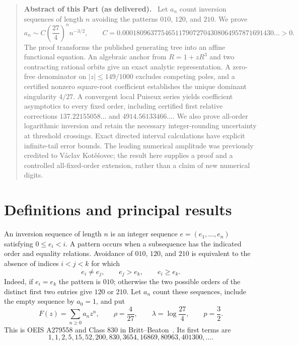 \documentclass[11pt,letterpaper]{article}
\theoremstyle{remark}\newtheorem{remark}[theorem]{Remark}
\newenvironment{partabstract}{\begin{quote}\small\noindent\textbf{Abstract of this Part (as delivered).}\ }{\end{quote}}
\begin{document}
\begin{partabstract}
Let $a_n$ count inversion sequences of length $n$ avoiding the patterns
$010$, $120$, and $210$. We prove
\[
 a_n\sim C\left(\frac{27}{4}\right)^n n^{-3/2},\qquad
 C=0.0001809637754651179072704308064957871691430\ldots>0.
\]
The proof transforms the published generating tree into an affine
functional equation. An algebraic anchor from $R=1+zR^3$ and two
contracting rational orbits give an exact analytic representation.
A zero-free denominator on $|z|\le149/1000$ excludes competing poles,
and a certified nonzero square-root coefficient establishes the unique
dominant singularity $4/27$. A convergent local Puiseux series yields
coefficient asymptotics to every fixed order, including certified first
relative corrections $137.22155058\ldots$ and $4914.56133466\ldots$.
We also prove all-order logarithmic inversion and retain the necessary
integer-rounding uncertainty at threshold crossings. Exact directed
interval calculations have explicit infinite-tail error bounds.
The leading numerical amplitude was previously credited to V\'aclav
Kot\v{e}\v{s}ovec; the result here supplies a proof and a controlled
all-fixed-order extension, rather than a claim of new numerical digits.
\end{partabstract}

\section{Definitions and principal results}
An inversion sequence of length $n$ is an integer sequence
$e=(e_1,\ldots,e_n)$ satisfying $0\le e_i<i$. A pattern occurs when a
subsequence has the indicated order and equality relations. Avoidance
of $010$, $120$, and $210$ is equivalent to the absence of indices
$i<j<k$ for which
\begin{equation}\label{ivk:anc:avoid}
 e_i\ne e_j,\qquad e_j>e_k,\qquad e_i\ge e_k.
\end{equation}
Indeed, if $e_i=e_k$ the pattern is $010$; otherwise the two possible
orders of the distinct first two entries give $120$ or $210$.
Let $a_n$ count these sequences, include the empty sequence by $a_0=1$,
and put
\begin{equation}\label{ivk:anc:constants}
 F(z)=\sum_{n\ge0}a_nz^n,\qquad \rho=\frac4{27},\qquad
 \lambda=\log\frac{27}{4},\qquad p=\frac32.
\end{equation}
This is OEIS A279558 and Class 830 in Britt--Beaton~\cite{bb,oeis830}.
Its first terms are
\[
 1,1,2,5,15,52,200,830,3654,16869,80963,401300,\ldots.
\]
\end{document}
